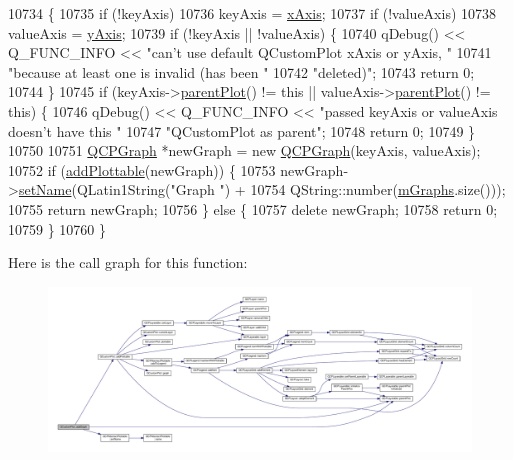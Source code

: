 \begin{DoxyCode}
10734                                                                     \{
10735   \textcolor{keywordflow}{if} (!keyAxis)
10736     keyAxis = \hyperlink{class_q_custom_plot_a9a79cd0158a4c7f30cbc702f0fd800e4}{xAxis};
10737   \textcolor{keywordflow}{if} (!valueAxis)
10738     valueAxis = \hyperlink{class_q_custom_plot_af6fea5679725b152c14facd920b19367}{yAxis};
10739   \textcolor{keywordflow}{if} (!keyAxis || !valueAxis) \{
10740     qDebug() << Q\_FUNC\_INFO << \textcolor{stringliteral}{"can't use default QCustomPlot xAxis or yAxis, "}
10741                                \textcolor{stringliteral}{"because at least one is invalid (has been "}
10742                                \textcolor{stringliteral}{"deleted)"};
10743     \textcolor{keywordflow}{return} 0;
10744   \}
10745   \textcolor{keywordflow}{if} (keyAxis->\hyperlink{class_q_c_p_layerable_ab7e0e94461566093d36ffc0f5312b109}{parentPlot}() != \textcolor{keyword}{this} || valueAxis->\hyperlink{class_q_c_p_layerable_ab7e0e94461566093d36ffc0f5312b109}{parentPlot}() != \textcolor{keyword}{this}) \{
10746     qDebug() << Q\_FUNC\_INFO << \textcolor{stringliteral}{"passed keyAxis or valueAxis doesn't have this "}
10747                                \textcolor{stringliteral}{"QCustomPlot as parent"};
10748     \textcolor{keywordflow}{return} 0;
10749   \}
10750 
10751   \hyperlink{class_q_c_p_graph}{QCPGraph} *newGraph = \textcolor{keyword}{new} \hyperlink{class_q_c_p_graph}{QCPGraph}(keyAxis, valueAxis);
10752   \textcolor{keywordflow}{if} (\hyperlink{class_q_custom_plot_ab7ad9174f701f9c6f64e378df77927a6}{addPlottable}(newGraph)) \{
10753     newGraph->\hyperlink{class_q_c_p_abstract_plottable_ab79c7ba76bc7fa89a4b3580e12149f1f}{setName}(QLatin1String(\textcolor{stringliteral}{"Graph "}) +
10754                       QString::number(\hyperlink{class_q_custom_plot_a38676b141ac8005fca4882a73ddfaf59}{mGraphs}.size()));
10755     \textcolor{keywordflow}{return} newGraph;
10756   \} \textcolor{keywordflow}{else} \{
10757     \textcolor{keyword}{delete} newGraph;
10758     \textcolor{keywordflow}{return} 0;
10759   \}
10760 \}
\end{DoxyCode}


Here is the call graph for this function\+:\nopagebreak
\begin{figure}[H]
\begin{center}
\leavevmode
\includegraphics[width=350pt]{class_q_custom_plot_a6fb2873d35a8a8089842d81a70a54167_cgraph}
\end{center}
\end{figure}


